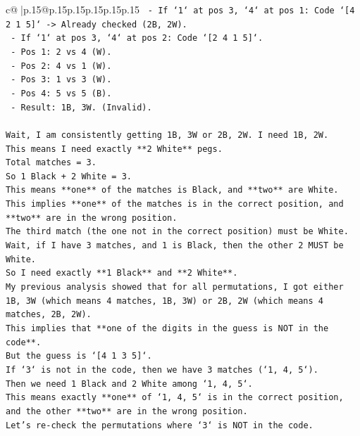 \documentclass{article}
\begin{document}
{\begin{supertabular}{c@{$\;$}|p{.15\linewidth}@{}p{.15\linewidth}p{.15\linewidth}p{.15\linewidth}p{.15\linewidth}p{.15\linewidth}}
{{{\texttt{        {-} If `1` at pos 3, `4` at pos 1: Code `{[}4 2 1 5{]}` {-}> Already checked (2B, 2W).} \\
\texttt{        {-} If `1` at pos 3, `4` at pos 2: Code `{[}2 4 1 5{]}`.} \\
\texttt{            {-} Pos 1: 2 vs 4 (W).} \\
\texttt{            {-} Pos 2: 4 vs 1 (W).} \\
\texttt{            {-} Pos 3: 1 vs 3 (W).} \\
\texttt{            {-} Pos 4: 5 vs 5 (B).} \\
\texttt{            {-} Result: 1B, 3W. (Invalid).} \\
\\ 
\texttt{Wait, I am consistently getting 1B, 3W or 2B, 2W. I need 1B, 2W.} \\
\texttt{This means I need exactly **2 White** pegs.} \\
\texttt{Total matches = 3.} \\
\texttt{So 1 Black + 2 White = 3.} \\
\texttt{This means **one** of the matches is Black, and **two** are White.} \\
\texttt{This implies **one** of the matches is in the correct position, and **two** are in the wrong position.} \\
\texttt{The third match (the one not in the correct position) must be White.} \\
\texttt{Wait, if I have 3 matches, and 1 is Black, then the other 2 MUST be White.} \\
\texttt{So I need exactly **1 Black** and **2 White**.} \\
\texttt{My previous analysis showed that for all permutations, I got either 1B, 3W (which means 4 matches, 1B, 3W) or 2B, 2W (which means 4 matches, 2B, 2W).} \\
\texttt{This implies that **one of the digits in the guess is NOT in the code**.} \\
\texttt{But the guess is `{[}4 1 3 5{]}`.} \\
\texttt{If `3` is not in the code, then we have 3 matches (`1, 4, 5`).} \\
\texttt{Then we need 1 Black and 2 White among `1, 4, 5`.} \\
\texttt{This means exactly **one** of `1, 4, 5` is in the correct position, and the other **two** are in the wrong position.} \\
\texttt{Let's re{-}check the permutations where `3` is NOT in the code.} \\
}}}
\end{supertabular}}
\end{document}
